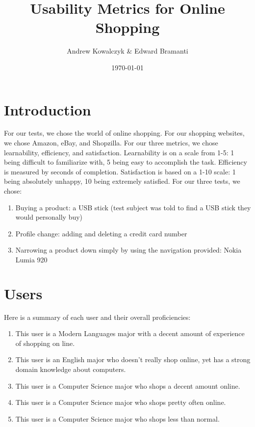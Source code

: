 \documentclass[11pt, oneside]{article}
\title{Usability Metrics for Online Shopping}
\author{Andrew Kowalczyk \& Edward Bramanti}
\date{\today}
\begin{document}
\maketitle

\section{Introduction}
For our tests, we chose the world of online shopping. For our shopping websites, we chose Amazon, eBay, and Shopzilla.
For our three metrics, we chose learnability, efficiency, and satisfaction. Learnability is on a scale from 1-5: 1 being difficult to familiarize with, 5 being easy to accomplish the task. Efficiency is measured by seconds of completion. Satisfaction is based on a 1-10 scale: 1 being absolutely unhappy, 10 being extremely satisfied.  For our three tests, we chose:

\begin{enumerate}
    \item Buying a product: a USB stick (test subject was told to find a USB stick they would personally buy)
    \item Profile change: adding and deleting a credit card number
    \item Narrowing a product down simply by using the navigation provided: Nokia Lumia 920
\end{enumerate}

\section{Users}

Here is a summary of each user and their overall proficiencies:

\begin{enumerate}
    \item This user is a Modern Languages major with a decent amount of experience of shopping on line.
    \item This user is an English major who doesn't really shop online, yet has a strong domain knowledge about computers.
    \item This user is a Computer Science major who shops a decent amount online.
    \item This user is a Computer Science major who shops pretty often online.
    \item This user is a Computer Science major who shops less than normal.
\end{enumerate}
\end{document}
